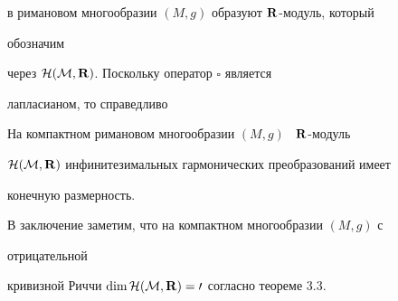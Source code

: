 в римановом многообразии $(M,g)$ образуют $\bold R$-модуль, который 


обозначим 


через $\cal H(M,\bold R)$. Поскольку оператор $\square$ является 


лапласианом, то справедливо 


 


\begin{cors} 


На компактном римановом многообразии $(M,g)$ \ $\bold R$-модуль 


$\cal H(M,\bold R)$ инфинитезимальных гармонических преобразований имеет 


конечную размерность. 


\end{cors} 


 


В заключение заметим, что на компактном многообразии $(M,g)$ с 


отрицательной 


кривизной Риччи $\dim\cal H(M,\bold R)=0$ согласно теореме 3.3. 


 


 


